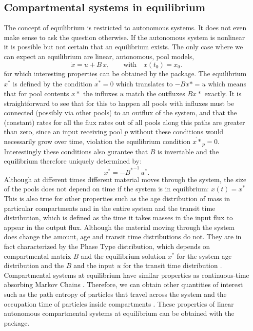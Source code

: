 \subsection{Compartmental systems in equilibrium} \label{sec:Equilibrium}
The concept of equilibrium is restricted to autonomous systems. 
It does not even make sense to ask the question otherwise. 
If the autonomous system is nonlinear it is possible but not certain that an
equilibrium exists. The only case where we can expect an equilibrium are
linear, autonomous, pool models, 
\begin{equation} \label{eq:LS}
\dot{x} = u + B \, x, \qquad  \mathrm{with} \quad x(t_0) = x_0.
\end{equation}
for which interesting properties can be
obtained by the \LAPM package.  The equilibrium $x^*$ is defined by the
condition  $\dot{x^*}=0$ which translates to $-B x*=u$ which means that for
pool contents $x*$ the influxes $u$ match the outfluxes $B x*$ exactly.  It is
straightforward to see that for this to happen all 
pools with influxes must be connected (possibly via other pools) to an outflux of
the system, and that the (constant) rates for all the flux rates out of all
pools along this paths are greater than zero, since an input receiving pool $p$
without these conditions would necessarily grow over time, violation the
equilibrium condition $\dot{x*}_p=0$. Interestingly these conditions also
gurantee that $B$ is invertable and the equilibrium therefore uniquely
determined by: 
\begin{equation} 
\label{eq:x_Binv_u}
x^* = - {B^*}^{-1} \, u^*.  
\end{equation}
Although at different times different material moves through the system, the
size of the pools does not depend on time if the system is in
equilibrium: $x(t)=x^*$ 
This is also true for other properties such as the
age distribution of mass in particular compartments and in the entire system
and the transit time distribution, which is defined as the time it takes masses
in the input flux to appear in the output flux. 
Although the material moving through the system does change the amount, age and transit
time distributions do not. 
They are in fact characterized by the Phase Type
distribution, which depends on compartmental matrix $B$ and the equilibrium
solution $x^*$ for the system age distribution and the $B$ and the input $u$
for the transit time distribution \citep{Metzler2018MGS}.
Compartmental systems at equilibrium have similar properties as continuous-time absorbing Markov Chains \citep{Metzler2018MGS}.
Therefore, we can obtain other quantities of interest such as  the path entropy of particles that travel across the system and the occupation time of particles inside compartments \citep{Metzler2020}. These properties of linear autonomous compartmental systems at equilibrium can be obtained with the \LAPM package.


